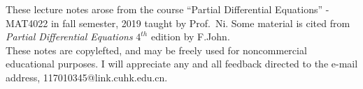 

\usepackage{pdfpages}
\usepackage{hyperref}
\newcommand\Emph{\textbf}
\newcommand\p{^{\prime}}
\newcommand\pp{^{\prime\prime}}
\newcommand{\lapl}[1]{\mathscr{L}\{#1\}}
\newcommand{\X}{\mathbb{X}}
\newcommand{\dX}{\dot{\mathbb{X}}}
\newcommand{\fX}{\bar{\text{\b{X}}}}
\newcommand{\ux}{u_x}
\newcommand{\uy}{u_y}
\newcommand{\uxx}{u_{xx}}
\newcommand{\uxy}{u_{xy}}
\newcommand{\uyy}{u_{yy}}
\newcommand{\ut}{u_{t}}
\newcommand{\utt}{u_{tt}}
\newcommand{\second}{2^{\text{nd}}}
\newcommand{\deriv}[2]{\frac{\diff#1}{\diff#2}}
\newcommand{\deriva}[1]{\frac{\diff}{\diff#1}}
\newcommand{\dakuohao}[2]{\left\{\begin{gathered}#1\\#2\end{gathered}\right.}
\newcommand{\dakuohaotri}[3]{\left\{\begin{gathered}#1\\#2\\#3\end{gathered}\right.}
%



\frontmatter



\subtitle{MAT4022 Notebook}



\halftitlepage
\titlepage



\tableofcontents


\acknowledgments
These lecture notes arose from the course ``Partial Differential Equations'' - MAT4022 in fall semester, 2019 taught by Prof.~Ni. Some material is cited from {\it Partial Differential Equations} $4^{th}$ edition by F.John. \\
These notes are copylefted, and may be freely used for noncommercial educational purposes. I will appreciate any and all feedback directed to the e-mail address, 117010345@link.cuhk.edu.cn.


\mainmatter
\setcounter{page}{1}











\backmatter



